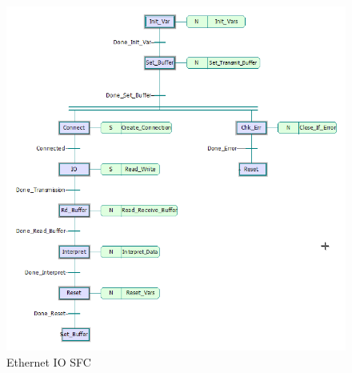 \documentclass{article}
\begin{document}
        \begin{figure}[h]
            \centering
            \includegraphics[scale=0.6]{img/ethernet_sfc}
            \caption{Ethernet IO SFC}
            \label{fig:ethernet_sfc}
        \end{figure}
        
\end{document}
